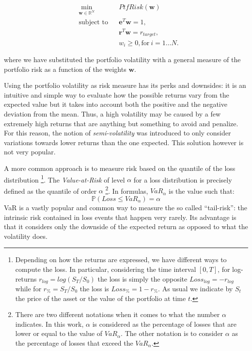 \begin{subequations}
	\label{eq:general_opt}
	\begin{align}
	&\!\min_{\mathbf{w}\in \mathbb{R}^{N}}     &    & PtfRisk(\mathbf{w}) \\
	& \text{subject to}   &   & \mathbf{e}^T\mathbf{w} = 1 ,\\
	&                 &       & \mathbf{r}^T\mathbf{w} = r_{target},\label{eq:constraint2} \\
	&		   &      & w_{i} \geq 0, \text{for} \: i = 1\dots N. 
	\end{align}
\end{subequations}

where we have substituted the portfolio volatility with a general measure of the portfolio risk as a function of the weights $\mathbf{w}$.

Using the portfolio volatility as risk measure has its perks and downsides: it is an intuitive and simple way to evaluate how the possible returns vary from the expected value but it takes into account both the positive and the negative deviation from the mean. Thus, a high volatility may be caused by a few extremely high returns that are anything but something to avoid and penalize.
For this reason, the notion of \textit{semi-volatility} was introduced to only consider variations towards lower returns than the one expected. This solution however is not very popular.

A more common approach is to measure risk based on the quantile of the loss distribution \footnote{Depending on how the returns are expressed, we have different ways to compute the loss. In particular, considering the time interval $[0, T]$, for log-returns $r_{log}=log(S_T/S_0)$ the loss is simply the opposite $Loss_{log} = - r_{log}$ while for $r_\% = S_T/S_0$  the loss is $Loss_\% = 1 - r_\%$. As usual we indicate by $S_t$ the price  of the asset or the value of the portfolio at time $t$.}. The \textit{Value-at-Risk} of level $\alpha$ for a loss distribution is precisely defined as the quantile of order $\alpha$ \footnote{ There are two different notations when it comes to what the number $\alpha$ indicates. In this work, $\alpha$ is considered as the percentage of losses that are lower or equal to the value of $VaR_\alpha$. The other notation is to consider $\alpha$ as the percentage of losses that exceed the $VaR_\alpha$. }.  In formulas, $VaR_\alpha$ is the value such that:
\begin{equation}
\mathbb{P}(Loss \leq VaR_\alpha) = \alpha
\end{equation}
VaR is a vastly popular and common way to measure the so called ``tail-risk'': the intrinsic risk contained in loss events that happen very rarely. 
Its advantage is that it considers only the downside of the expected return as opposed to what the volatility does.

